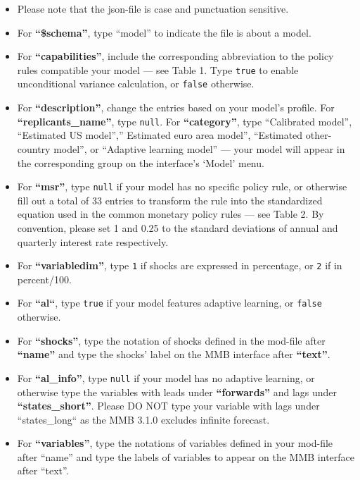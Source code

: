 \documentclass[10pt,a4paper]{article}
\begin{document}
\begin{itemize}
\item Please note that the json-file is case and punctuation sensitive.

\item For \textbf{“\$schema”}, type “model” to indicate the file is about a model.

\item For \textbf{“capabilities”}, include the corresponding abbreviation to the policy rules compatible your model — see Table 1. Type \texttt{true} to enable unconditional variance calculation, or \texttt{false} otherwise.

\item For \textbf{“description”}, change the entries based on your model's profile. For \textbf{“replicants\_name”}, type \texttt{null}. For \textbf{“category”}, type “Calibrated model”, “Estimated US model”,” Estimated euro area model”, “Estimated other-country model”, or “Adaptive learning model” — your model will appear in the corresponding group on the interface’s ‘Model’ menu.

\item For \textbf{“msr”}, type \texttt{null} if your model has no specific policy rule, or otherwise fill out a total of 33 entries to transform the rule into the standardized equation used in the common monetary policy rules — see Table 2. By convention, please set 1 and 0.25 to the standard deviations of annual and quarterly interest rate respectively.

\item For \textbf{“variabledim”}, type \texttt{1} if shocks are expressed in percentage, or \texttt{2} if in percent/100.

\item For \textbf{“al“}, type \texttt{true} if your model features adaptive learning, or \texttt{false} otherwise.

\item For \textbf{“shocks”}, type the notation of shocks defined in the mod-file after \textbf{“name”} and type the shocks' label on the MMB interface after \textbf{“text”}.

\item For \textbf{“al\_info”}, type \texttt{null} if your model has no adaptive learning, or otherwise type the variables with leads under \textbf{“forwards”} and lags under \textbf{“states\_short”}. Please DO NOT type your variable with lags under “states\_long“ as the MMB 3.1.0 excludes infinite forecast.

\item For \textbf{“variables”}, type the notations of variables defined in your mod-file after “name” and type the labels of variables to appear on the MMB interface after “text”.
\end{itemize}
\end{document}
